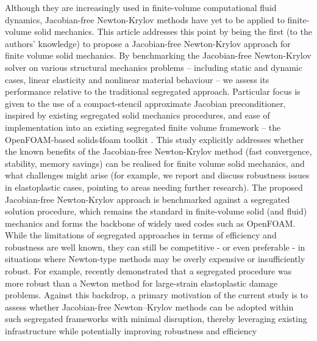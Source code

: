 \documentclass[sn-mathphys,Numbered]{sn-jnl}%
\begin{document}
Although they are increasingly used in finite-volume computational fluid dynamics, Jacobian-free Newton-Krylov methods have yet to be applied to finite-volume solid mechanics.
This article addresses this point by being the first (to the authors' knowledge) to propose a Jacobian-free Newton-Krylov approach for finite volume solid mechanics.
By benchmarking the Jacobian-free Newton-Krylov solver on various structural mechanics problems – including static and dynamic cases, linear elasticity and nonlinear material behaviour – we assess its performance relative to the traditional segregated approach.
Particular focus is given to the use of a compact-stencil approximate Jacobian preconditioner, inspired by existing segregated solid mechanics procedures, and ease of implementation into an existing segregated finite volume framework -- the OpenFOAM-based solids4foam toolkit \citep{Cardiff2018}.
This study explicitly addresses whether the known benefits of the Jacobian-free Newton-Krylov method (fast convergence, stability, memory savings) can be realised for finite volume solid mechanics, and what challenges might arise (for example, we report and discuss robustness issues in elastoplastic cases, pointing to areas needing further research).
The proposed Jacobian-free Newton-Krylov approach is benchmarked against a segregated solution procedure, which remains the standard in finite-volume solid (and fluid) mechanics and forms the backbone of widely used codes such as OpenFOAM.
While the limitations of segregated approaches in terms of efficiency and robustness are well known, they can still be competitive - or even preferable - in situations where Newton-type methods may be overly expensive or insufficiently robust. For example, \citet{Whelan2025} recently demonstrated that a segregated procedure was more robust than a Newton method for large-strain elastoplastic damage problems. %
Against this backdrop, a primary motivation of the current study is to assess whether Jacobian-free Newton–Krylov methods can be adopted within such segregated frameworks with minimal disruption, thereby leveraging existing infrastructure while potentially improving robustness and efficiency
\end{document}
